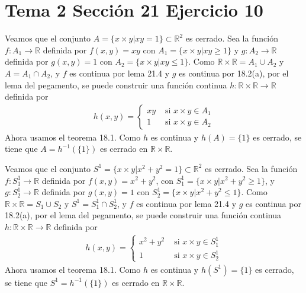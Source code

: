 \documentclass{article}
\begin{document}
\section{Tema 2 Sección 21 Ejercicio 10}
Veamos que el conjunto $A=\{x\times y| xy=1\}\subset\mathbb{R}^2$ es cerrado.
Sea la función $f:A_1\rightarrow \mathbb{R}$ definida por $f(x,y)=xy$ con $A_1=\{x\times y|xy\geq 1\}$ y $g:A_2\rightarrow \mathbb{R}$ definida por $g(x,y)=1$ con $A_2=\{x\times y|xy\leq 1\}$. Como $\mathbb{R}\times \mathbb{R}= A_1\cup A_2$ y $A=A_1\cap A_2$, y $f$ es continua por lema 21.4 y $g$ es continua por 18.2(a), por el lema del pegamento, se puede construir una función continua $h:\mathbb{R}\times \mathbb{R}\rightarrow\mathbb{R}$ definida por 
\begin{eqnarray}
h(x,y)=\begin{cases}
xy & \text{ si }x\times y \in A_1\nonumber\\
1 & \text{ si }x\times y \in A_2
\end{cases}
\end{eqnarray}
Ahora usamos el teorema 18.1. Como $h$ es continua y $h(A)=\{1\}$ es cerrado, se tiene que $A=h^{-1}(\{1\})$ es cerrado en $\mathbb{R}\times\mathbb{R}$.

Veamos que el conjunto $S^1=\{x\times y| x^2+y^2=1\}\subset\mathbb{R}^2$ es cerrado.
Sea la función $f:S^1_1\rightarrow \mathbb{R}$ definida por $f(x,y)=x^2+y^2$, con $S^1_1=\{x\times y|x^2+y^2\geq 1\}$, y $g:S^1_2\rightarrow \mathbb{R}$ definida por $g(x,y)=1$ con $S^1_2=\{x\times y|x^2+y^2\leq 1\}$. Como $\mathbb{R}\times \mathbb{R}= S_1\cup S_2$ y $S^1=S^1_1\cap S^1_2$, y $f$ es continua por lema 21.4 y $g$ es continua por 18.2(a), por el lema del pegamento, se puede construir una función continua $h:\mathbb{R}\times \mathbb{R}\rightarrow\mathbb{R}$ definida por 
\begin{eqnarray}
h(x,y)=\begin{cases}
x^2+y^2 & \text{ si }x\times y \in S^1_1\nonumber\\
1 & \text{ si }x\times y \in S^1_2
\end{cases}
\end{eqnarray}
Ahora usamos el teorema 18.1. Como $h$ es continua y $h(S^1)=\{1\}$ es cerrado, se tiene que $S^1=h^{-1}(\{1\})$ es cerrado en $\mathbb{R}\times\mathbb{R}$.
\end{document}
